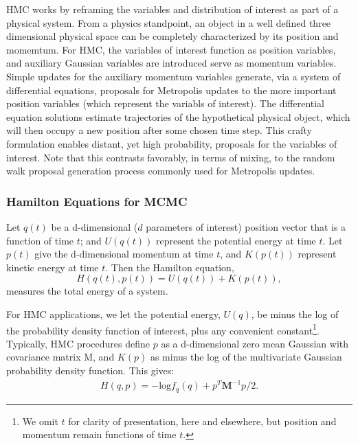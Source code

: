 \documentclass{article}
\begin{document}
HMC works by reframing the variables and distribution of interest as part of a physical system. From a physics standpoint, an object in a well defined three dimensional physical space can be completely characterized by its position and momemtum. For HMC, the variables of interest function as position variables, and auxiliary Gaussian variables are introduced serve as momentum variables. Simple updates for the auxiliary momentum variables generate, via a system of differential equations, proposals for Metropolis updates to the more important position variables (which represent the variabls of interest). The differential equation solutions estimate trajectories of the hypothetical physical object, which will then occupy a new position after some chosen time step. This crafty formulation enables distant, yet high probability, proposals for the variables of interest. Note that this contrasts favorably, in terms of mixing, to the random walk proposal generation process commonly used for Metropolis updates.

\subsubsection*{Hamilton Equations for MCMC}

Let $q(t)$ be a d-dimensional ($d$ parameters of interest) position vector that is a function of time $t$; and $U(q(t))$ represent the potential energy at time $t$. Let $p(t)$ give the d-dimensional momentum at time $t$, and $K(p(t))$ represent kinetic energy at time $t$. Then the Hamilton equation,
\begin{equation}
H(q(t),p(t)) = U(q(t)) + K(p(t)),
\end{equation}
measures the total energy of a system. 

For HMC applications, we let the potential energy, $U(q)$, be minus the log of the probability density function of interest, plus any convenient constant\footnote{We omit $t$ for clarity of presentation, here and elsewhere, but position and momentum remain functions of time $t$.}. Typically, HMC procedures define $p$ as a d-dimensional zero mean Gaussian with covariance matrix M, and $K(p)$ as minus the log of the multivariate Gaussian probability density function. This gives:
\begin{align}
H(q,p) = -\text{log}f_{q}(q) + p^{T}\pmb{M}^{-1}p/2.
\end{align}
\end{document}
